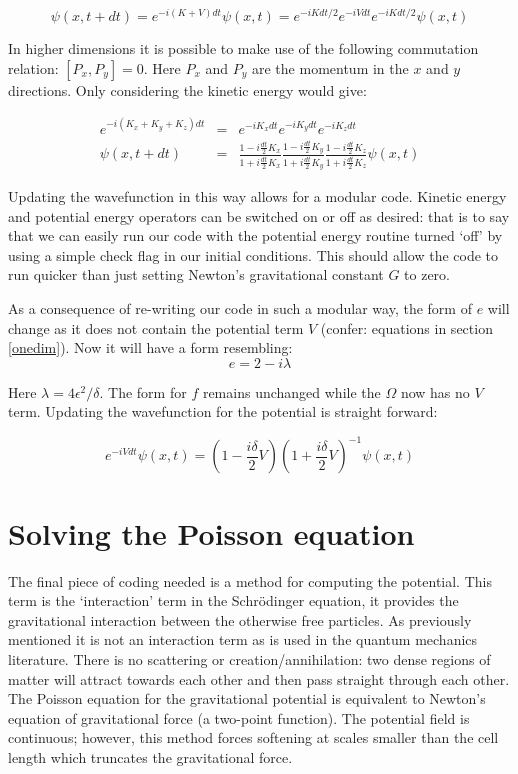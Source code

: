 \begin{equation}
\psi(x, t+dt) = e^{-i (K+V) dt} \psi(x, t) = e^{-i K dt/2} e^{-i V dt} e^{-i K dt/2} \psi(x, t)
\end{equation}

\noindent In higher dimensions it is possible to make use of the following commutation relation: $[P_x, P_y] = 0$. Here $P_x$ and $P_y$ are the momentum in the $x$ and $y$ directions. Only considering the kinetic energy would give:

\begin{eqnarray}
 e^{-i(K_x + K_y + K_z)dt} &=& e^{-i K_x dt} e^{-i K_y dt} e^{-i K_z dt} \nonumber \\
\psi(x, t+dt) &=& \frac{1- i\frac{dt}{2} K_x}{1+ i\frac{dt}{2} K_x} \frac{1-i\frac{dt}{2} K_y}{1+i\frac{dt}{2} K_y}\frac{1-i\frac{dt}{2} K_z}{1+i\frac{dt}{2} K_z} \psi(x, t)
\end{eqnarray}

\noindent Updating the wavefunction in this way allows for a modular code. Kinetic energy and potential energy operators can be switched on or off as desired: that is to say that we can easily run our code with the potential energy routine turned `off' by using a simple check flag in our initial conditions. This should allow the code to run quicker than just setting Newton's gravitational constant $G$ to zero.

As a consequence of re-writing our code in such a modular way, the form of $e$ will change as it does not contain the potential term $V$ (confer: equations in section \ref{onedim}). Now it will have a form resembling:
\begin{equation}
e = 2 - i\lambda
\end{equation}

\noindent Here $\lambda = 4\epsilon^2/\delta$. The form for $f$ remains unchanged while the $\Omega$ now has no $V$ term. Updating the wavefunction for the potential is straight forward:

\begin{equation}
e^{-i V dt} \psi(x, t) = (1 -\frac{i\delta}{2}V)(1 +\frac{i\delta}{2}V)^{-1} \psi(x, t)
\end{equation}


\section{Solving the Poisson equation}
\label{sol_poi}
The final piece of coding needed is a method for computing the potential. This term is the `interaction' term in the Schr\"odinger equation, it provides the gravitational interaction between the otherwise free particles. As previously mentioned it is not an interaction term as is used in the quantum mechanics literature. There is no scattering or creation/annihilation: two dense regions of matter will attract towards each other and then pass straight through each other. The Poisson equation for the gravitational potential is equivalent to Newton's equation of gravitational force (a two-point function). The potential field is continuous; however, this method forces softening at scales smaller than the cell length which truncates the gravitational force.

